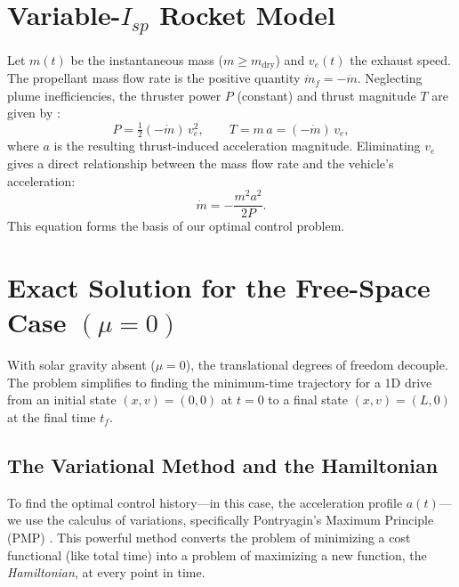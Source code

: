 \documentclass[journal, a4paper]{IEEEtran}
\begin{document}
\section{Variable-$I_{\!sp}$ Rocket Model}
Let $m(t)$ be the instantaneous mass ($m \ge m_\mathrm{dry}$) and $v_e(t)$ the exhaust speed. The propellant mass flow rate is the positive quantity $\dot m_f = -\dot m$. Neglecting plume inefficiencies, the thruster power $P$ (constant) and thrust magnitude $T$ are given by \cite{Sutton2017}:
\begin{equation}
  P = \tfrac12 (-\dot m)\,v_e^{2},\qquad
  T   = m\,a = (-\dot m)\,v_e,
  \label{eq:power_thrust}
\end{equation}
where $a$ is the resulting thrust-induced acceleration magnitude. Eliminating $v_e$ gives a direct relationship between the mass flow rate and the vehicle's acceleration:
\begin{equation}
  \dot m = -\frac{m^{2}a^{2}}{2P}.
  \label{eq:mass_flow}
\end{equation}
This equation forms the basis of our optimal control problem.

\section{Exact Solution for the Free-Space Case $(\mu=0)$}
\label{sec:free_space_solution}
With solar gravity absent ($\mu=0$), the translational degrees of freedom decouple. The problem simplifies to finding the minimum-time trajectory for a 1D drive from an initial state $(x, v) = (0, 0)$ at $t=0$ to a final state $(x, v) = (L, 0)$ at the final time $t_f$.

\subsection{The Variational Method and the Hamiltonian}
\label{sec:pmp_theory}
To find the optimal control history---in this case, the acceleration profile $a(t)$---we use the calculus of variations, specifically Pontryagin's Maximum Principle (PMP) \cite{Pontryagin1962}. This powerful method converts the problem of minimizing a cost functional (like total time) into a problem of maximizing a new function, the \emph{Hamiltonian}, at every point in time.
\end{document}
